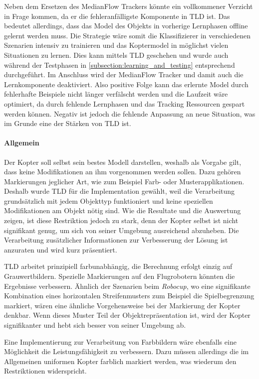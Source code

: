 		Neben dem Ersetzen des MedianFlow Trackers könnte ein vollkommener Verzicht in Frage kommen, da er die fehleranfälligste Komponente in TLD ist. Das bedeutet allerdings, dass das Model des Objekts in vorherige Lernphasen offline gelernt werden muss. Die Strategie wäre somit die Klassifizierer in verschiedenen Szenarien intensiv zu trainieren und das Koptermodel in möglichst vielen Situationen zu lernen. Dies kann mittels TLD geschehen und wurde auch während der Testphasen in \ref{subsection:learning_and_testing} entsprechend durchgeführt. Im Anschluss wird der MedianFlow Tracker und damit auch die Lernkomponente deaktiviert. Also positive Folge kann das erlernte Model durch fehlerhafte Beispiele nicht länger verfälscht werden und die Laufzeit wäre optimiert, da durch fehlende Lernphasen und das Tracking Ressourcen gespart werden können. Negativ ist jedoch die fehlende Anpassung an neue Situation, was im Grunde eine der Stärken von TLD ist.

	\paragraph{Allgemein}
		Der Kopter soll selbst sein bestes Modell darstellen, weshalb als Vorgabe gilt, dass keine Modifikationen an ihm vorgenommen werden sollen. Dazu gehören Markierungen jeglicher Art, wie zum Beispiel Farb- oder Musterapplikationen. Deshalb wurde TLD für die Implementation gewählt, weil die Verarbeitung grundsätzlich mit jedem Objekttyp funktioniert und keine speziellen Modifikationen am Objekt nötig sind. Wie die Resultate und die Auswertung zeigen, ist diese Restriktion jedoch zu stark, denn der Kopter selbst ist nicht signifikant genug, um sich von seiner Umgebung ausreichend abzuheben. Die Verarbeitung zusätzlicher Informationen zur Verbesserung der Lösung ist anzuraten und wird kurz präsentiert.

		TLD arbeitet prinzipiell farbunabhängig, die Berechnung erfolgt einzig auf Grauwertbildern. Spezielle Markierungen auf den Flugrobotern könnten die Ergebnisse verbessern. Ähnlich der Szenarien beim \textit{Robocup}, wo eine signifikante Kombination eines horizontalen Streifenmusters zum Beispiel die Spielbegrenzung markiert, wären eine ähnliche Vorgehensweise bei der Markierung der Kopter denkbar. Wenn dieses Muster Teil der Objektrepräsentation ist, wird der Kopter signifikanter und hebt sich besser von seiner Umgebung ab.

		Eine Implementierung zur Verarbeitung von Farbbildern wäre ebenfalls eine Möglichkeit die Leistungsfähigkeit zu verbessern. Dazu müssen allerdings die im Allgemeinen uniformen Kopter farblich markiert werden, was wiederum den Restriktionen widerspricht.


